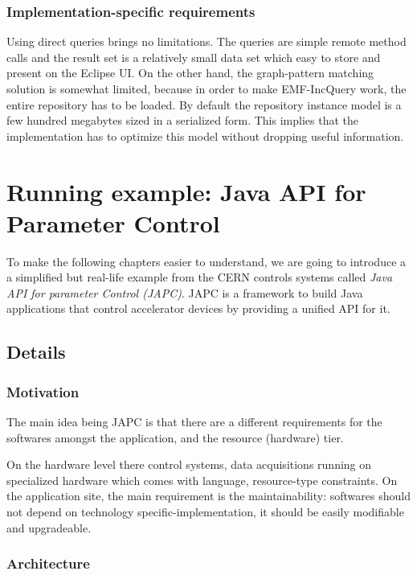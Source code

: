 \subsubsection{Implementation-specific requirements}
Using direct queries brings no limitations. The queries are simple remote method
calls and the result set is a relatively small data set which easy to store and
present on the Eclipse UI. On the other hand, the graph-pattern matching
solution is somewhat limited, because in order to make EMF-IncQuery work,
the entire repository has to be loaded. By default the repository instance model
is a few hundred megabytes sized in a serialized form. This implies that the
implementation has to optimize this model without dropping useful information.

\section{Running example: Java API for Parameter Control}\label{sect:spf}
To make the following chapters easier to understand, we are going to introduce a
a simplified but real-life example from the CERN controls systems called
\emph{Java API for parameter Control (JAPC)}\cite{Japc05}.  JAPC is a
framework to build Java applications that control accelerator devices by
providing a unified API for it. 

\subsection{Details}\label{sect:spfdesc}

\subsubsection{Motivation}
The main idea being JAPC is that there are a different requirements for the 
softwares amongst the application, and the resource (hardware) tier. 

On the hardware level there control systems, data acquisitions 
running on specialized hardware which comes with language, resource-type
constraints. On the application site, the main requirement is the
maintainability: softwares should not depend on technology
specific-implementation, it should be easily modifiable and upgradeable.

\subsubsection{Architecture}

